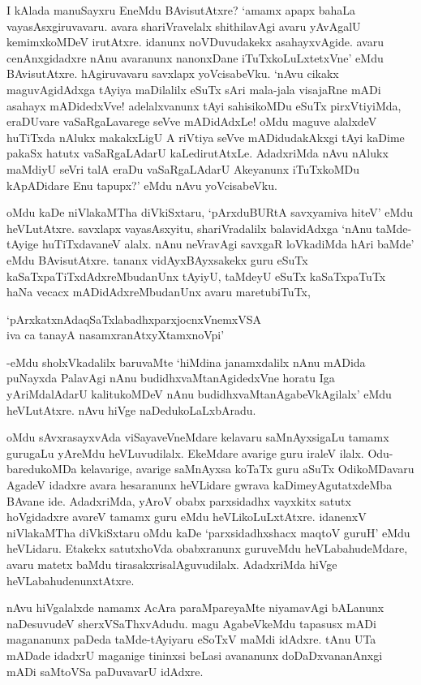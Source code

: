 I kAlada manuSayxru EneMdu BAvisutAtxre? `amamx apapx bahaLa vayasAsxgiruvavaru. avara shariVravelalx shithilavAgi avaru yAvAgalU kemimxkoMDeV irutAtxre. idanunx noVDuvudakekx asahayxvAgide. avaru cenAnxgidadxre nAnu avaranunx nanonxDane iTuTxkoLuLxtetxVne' eMdu BAvisutAtxre. hAgiruvavaru savxlapx yoVcisabeVku. `nAvu cikakx maguvAgidAdxga tAyiya maDilalilx eSuTx sAri mala-jala visajaRne mADi asahayx mADidedxVve! adelalxvanunx tAyi sahisikoMDu eSuTx pirxVtiyiMda, eraDUvare vaSaRgaLavarege seVve mADidAdxLe! oMdu maguve alalxdeV huTiTxda nAlukx makakxLigU A riVtiya seVve mADidudakAkxgi tAyi kaDime pakaSx hatutx vaSaRgaLAdarU kaLedirutAtxLe. AdadxriMda nAvu nAlukx maMdiyU seVri talA eraDu vaSaRgaLAdarU Akeyanunx iTuTxkoMDu kApADidare Enu tapupx?' eMdu nAvu yoVcisabeVku.

oMdu kaDe niVlakaMTha diVkiSxtaru, `pArxduBURtA savxyamiva hiteV' eMdu heVLutAtxre. savxlapx vayasAsxyitu, shariVradalilx balavidAdxga `nAnu taMde-tAyige huTiTxdavaneV alalx. nAnu neVravAgi savxgaR loVkadiMda hAri baMde' eMdu BAvisutAtxre. tananx vidAyxBAyxsakekx guru eSuTx kaSaTxpaTiTxdAdxreMbudanUnx tAyiyU, taMdeyU eSuTx kaSaTxpaTuTx haNa vecacx mADidAdxreMbudanUnx avaru maretubiTuTx,

\begin{shloka}
`pArxkatxnAdaqSaTxlabadhxparxjocnxVnemxVSA\\
iva ca tanayA nasamxranAtxyXtamxnoV\s pi'
\end{shloka}

-eMdu sholxVkadalilx baruvaMte `hiMdina janamxdalilx nAnu mADida puNayxda PalavAgi nAnu budidhxvaMtanAgidedxVne horatu Iga yAriMdalAdarU kalitukoMDeV nAnu budidhxvaMtanAgabeVkAgilalx' eMdu heVLutAtxre. nAvu hiVge naDedukoLaLxbAradu.

oMdu sAvxrasayxvAda viSayaveVneMdare kelavaru saMnAyxsigaLu tamamx gurugaLu yAreMdu heVLuvudilalx. EkeMdare avarige guru iraleV ilalx. Odu-baredukoMDa kelavarige, avarige saMnAyxsa koTaTx guru aSuTx OdikoMDavaru AgadeV idadxre avara hesaranunx heVLidare gwrava kaDimeyAgutatxdeMba BAvane ide. AdadxriMda, yAroV obabx parxsidadhx vayxkitx satutx hoVgidadxre avareV tamamx guru eMdu heVLikoLuLxtAtxre. idanenxV niVlakaMTha diVkiSxtaru oMdu kaDe `parxsidadhxshacx maqtoV guruH' eMdu heVLidaru. Etakekx satutxhoVda obabxranunx guruveMdu heVLabahudeMdare, avaru matetx baMdu tirasakxrisalAguvudilalx. AdadxriMda hiVge heVLabahudenunxtAtxre.

nAvu hiVgalalxde namamx AcAra paraMpareyaMte niyamavAgi bALanunx naDesuvudeV sherxVSaThxvAdudu. magu AgabeVkeMdu tapasusx mADi magananunx paDeda taMde-tAyiyaru eSoTxV maMdi idAdxre. tAnu UTa mADade idadxrU maganige tininxsi beLasi avananunx doDaDxvananAnxgi mADi saMtoVSa paDuvavarU idAdxre.

